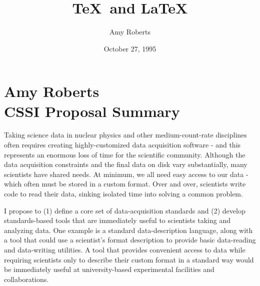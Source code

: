 \documentclass[11pt]{report}   %
\begin{document}
\title{\TeX\ and \LaTeX}   %
\author{Amy Roberts}         %
\date{October 27, 1995}    %


\section*{Amy Roberts \\ CSSI Proposal Summary}
Taking science data in nuclear physics and other medium-count-rate disciplines often requires creating highly-customized data acquisition software - and this represents an enormous loss of time for the scientific community.  Although the data acquisition constraints and the final data on disk vary substantially, many scientists have shared needs.  At minimum, we all need easy access to our data - which often must be stored in a custom format.  Over and over, scientists write code to read their data, sinking isolated time into solving a common problem.




I propose to (1) define a core set of data-acquisition standards and (2) develop standards-based tools that are immediately useful to scientists taking and analyzing data.  One example is a standard data-description language, along with a tool that could use a scientist's format description to provide basic data-reading and data-writing utilities.  A tool that provides convenient access to data while requiring scientists only to describe their custom format in a standard way would be immediately useful at university-based experimental facilities and collaborations.  
\end{document}

